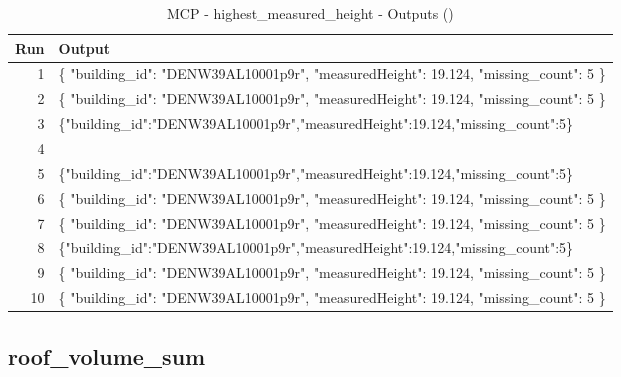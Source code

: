 \documentclass[a4paper,11pt]{article}
\begin{document}
\clearpage

\begin{table}[ht]
\centering
\scriptsize
\caption{MCP - highest\_measured\_height - Outputs ()}
\label{tab:mcp\_highest\_measured\_height\_outputs\_}
\begin{tabular}{r p{12cm}}
\hline
Run & Output \\
\hline
1 & \{
  "building\_id": "DENW39AL10001p9r",
  "measuredHeight": 19.124,
  "missing\_count": 5
\} \\
2 & \{
  "building\_id": "DENW39AL10001p9r",
  "measuredHeight": 19.124,
  "missing\_count": 5
\} \\
3 & \{"building\_id":"DENW39AL10001p9r","measuredHeight":19.124,"missing\_count":5\} \\
4 &  \\
5 & \{"building\_id":"DENW39AL10001p9r","measuredHeight":19.124,"missing\_count":5\} \\
6 & \{
  "building\_id": "DENW39AL10001p9r",
  "measuredHeight": 19.124,
  "missing\_count": 5
\} \\
7 & \{
  "building\_id": "DENW39AL10001p9r",
  "measuredHeight": 19.124,
  "missing\_count": 5
\} \\
8 & \{"building\_id":"DENW39AL10001p9r","measuredHeight":19.124,"missing\_count":5\} \\
9 & \{
  "building\_id": "DENW39AL10001p9r",
  "measuredHeight": 19.124,
  "missing\_count": 5
\} \\
10 & \{
  "building\_id": "DENW39AL10001p9r",
  "measuredHeight": 19.124,
  "missing\_count": 5
\} \\
\hline
\end{tabular}
\end{table}

\clearpage
\subsection{roof\_volume\_sum}
\end{document}
